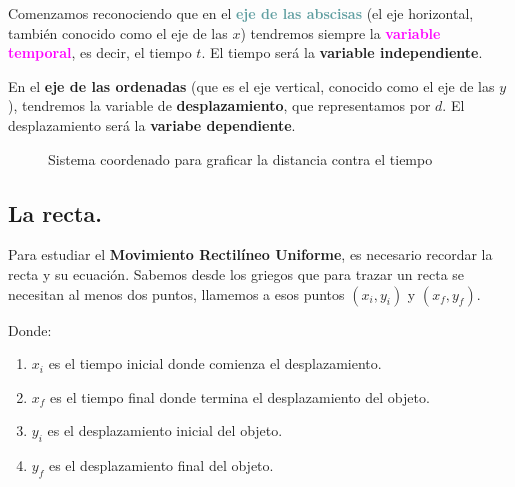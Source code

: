 \documentclass[14pt]{extarticle}
\newcommand{\textocolor}[2]{\textbf{\textcolor{#1}{#2}}}
\begin{document}
Comenzamos reconociendo que en el \textocolor{cadetblue}{eje de las abscisas} (el eje horizontal, también conocido como el eje de las $x$) tendremos siempre la \textocolor{magenta}{variable temporal}, es decir, el tiempo $t$. El tiempo será la \textocolor{alizarin}{variable independiente}.

En el \textocolor{ballblue}{eje de las ordenadas} (que es el eje vertical, conocido como el eje de las $y$), tendremos la variable de \textocolor{auburn}{desplazamiento}, que representamos por $d$. El desplazamiento será la \textocolor{burntumber}{variabe dependiente}.

\begin{figure}[H]
    \centering
    \caption{Sistema coordenado para graficar la distancia contra el tiempo}
\end{figure}

\subsection{La recta.}

Para estudiar el \textocolor{byzantium}{Movimiento Rectilíneo Uniforme}, es necesario recordar la recta y su ecuación. Sabemos desde los griegos que para trazar un recta se necesitan al menos dos puntos, llamemos a esos puntos $(x_{i}, y_{i})$ y $(x_{f}, y_{f})$.

Donde:
\begin{enumerate}[label=\alph*)]
\item $x_{i}$ es el tiempo inicial donde comienza el desplazamiento.
\item $x_{f}$ es el tiempo final donde termina el desplazamiento del objeto.
\item $y_{i}$ es el desplazamiento inicial del objeto.
\item $y_{f}$ es el desplazamiento final del objeto.
\end{enumerate} 
\end{document}

